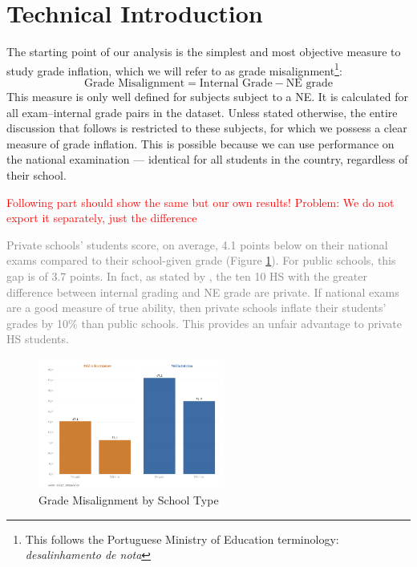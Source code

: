 \documentclass{article}
\begin{document}
\section{Technical Introduction}
\label{sec:TechnicalIntroduction}

The starting point of our analysis is the simplest and most objective measure to study grade inflation, which we will refer to as grade misalignment\footnote{This follows the Portuguese Ministry of Education terminology: \textit{desalinhamento de nota}}:
\[
\text{Grade Misalignment} = \text{Internal Grade} - \text{NE grade}
\]  
This measure is only well defined for subjects subject to a NE. It is calculated for all exam–internal grade pairs in the dataset. Unless stated otherwise, the entire discussion that follows is restricted to these subjects, for which we possess a clear measure of grade inflation. This is possible because we can use performance on the national examination — identical for all students in the country, regardless of their school.

\textcolor{red}{Following part should show the same but our own results! Problem: We do not export it separately, just the difference}

\textcolor{gray}{Private schools' students score, on average, 4.1 points below on their national exams compared to their school-given grade (Figure \ref{fig: InflationBySchoolType}). For public schools, this gap is of 3.7 points. In fact, as stated by \cite{sapo2024}, the ten 10 HS with the greater difference between internal grading and NE grade are private.
If national exams are a good measure of true ability, then private schools inflate their students' grades by 10\% than public schools. This provides an unfair advantage to private HS students.}

\begin{figure}[ht]
  \centering
  \includegraphics[height=4.3cm, keepaspectratio]{Figures/InflationBySchoolType.png}
  \caption{Grade Misalignment by School Type \citep{sapo2024}}
  \label{fig: InflationBySchoolType}
\end{figure}
\end{document}
